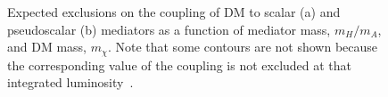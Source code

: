 \begin{figure}

  \caption[Expected exclusions on the coupling of DM to scalar (a) and pseudoscalar (b) mediators as a function of mediator mass, $m_{H}/m_{A}$, and DM mass, $m_{\chi}$. Note that some contours are not shown because the corresponding value of the coupling is not excluded at that integrated luminosity.]{Expected exclusions on the coupling of DM to scalar (a) and pseudoscalar (b) mediators as a function of mediator mass, $m_{H}/m_{A}$, and DM mass, $m_{\chi}$. Note that some contours are not shown because the corresponding value of the coupling is not excluded at that integrated luminosity~\cite{ourdmpaper}.}
  \label{fig:simplifiedmodellimits}
\end{figure}

